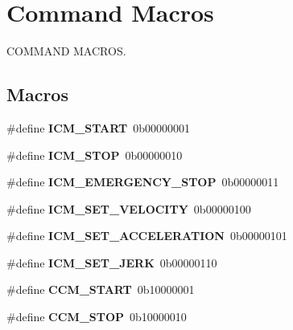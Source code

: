 \hypertarget{group__cmd__macros}{}\section{Command Macros}
\label{group__cmd__macros}


C\+O\+M\+M\+A\+ND M\+A\+C\+R\+OS.  


\subsection*{Macros}
\begin{DoxyCompactItemize}
\item 
\hypertarget{group__cmd__macros_gad82c7b60360aa531c85bb84917025deb}{}\label{group__cmd__macros_gad82c7b60360aa531c85bb84917025deb} 
\#define {\bfseries I\+C\+M\+\_\+\+S\+T\+A\+RT}~0b00000001
\item 
\hypertarget{group__cmd__macros_ga33694863f462c4822d6cbc2e4c007f79}{}\label{group__cmd__macros_ga33694863f462c4822d6cbc2e4c007f79} 
\#define {\bfseries I\+C\+M\+\_\+\+S\+T\+OP}~0b00000010
\item 
\hypertarget{group__cmd__macros_gaaa54a6e1ceef1b79b13d60ea1b91b84a}{}\label{group__cmd__macros_gaaa54a6e1ceef1b79b13d60ea1b91b84a} 
\#define {\bfseries I\+C\+M\+\_\+\+E\+M\+E\+R\+G\+E\+N\+C\+Y\+\_\+\+S\+T\+OP}~0b00000011
\item 
\hypertarget{group__cmd__macros_ga55dc16bc5a0b809dac0a97ddf5d8baad}{}\label{group__cmd__macros_ga55dc16bc5a0b809dac0a97ddf5d8baad} 
\#define {\bfseries I\+C\+M\+\_\+\+S\+E\+T\+\_\+\+V\+E\+L\+O\+C\+I\+TY}~0b00000100
\item 
\hypertarget{group__cmd__macros_gae856a1469f8f790d2dad2405b1312b72}{}\label{group__cmd__macros_gae856a1469f8f790d2dad2405b1312b72} 
\#define {\bfseries I\+C\+M\+\_\+\+S\+E\+T\+\_\+\+A\+C\+C\+E\+L\+E\+R\+A\+T\+I\+ON}~0b00000101
\item 
\hypertarget{group__cmd__macros_gaf9f508cc43116649f99dacebeaf1f5d8}{}\label{group__cmd__macros_gaf9f508cc43116649f99dacebeaf1f5d8} 
\#define {\bfseries I\+C\+M\+\_\+\+S\+E\+T\+\_\+\+J\+E\+RK}~0b00000110
\item 
\hypertarget{group__cmd__macros_ga192e2456b03e5e8d599e94c536d332a0}{}\label{group__cmd__macros_ga192e2456b03e5e8d599e94c536d332a0} 
\#define {\bfseries C\+C\+M\+\_\+\+S\+T\+A\+RT}~0b10000001
\item 
\hypertarget{group__cmd__macros_ga46d6f56bfb1ae782ee1737a3260ed568}{}\label{group__cmd__macros_ga46d6f56bfb1ae782ee1737a3260ed568} 
\#define {\bfseries C\+C\+M\+\_\+\+S\+T\+OP}~0b10000010

\end{DoxyCompactItemize}
